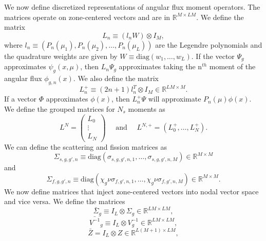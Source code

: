 We now define discretized representations of angular flux moment operators. The matrices operate on zone-centered vectors and are in $\mathbb{R}^{M \times LM}$. We define the matrix
\begin{equation}
	L_{n} \equiv (l_{n}W) \otimes I_{M},
\end{equation}
where $l_{n} \equiv (P_{n}(\mu_{1}), P_{n}(\mu_{2}), \dots, P_{n}(\mu_{L}))$ are the Legendre polynomials and the quadrature weights are given by $W \equiv \text{diag}(w_{1}, \dots, w_{L})$.
If the vector $\Psi_{g}$ approximates $\psi_{g}(x, \mu)$, then $L_{n}\Psi_{g}$ approximates taking the n$^{th}$ moment of the angular flux $\phi_{g,n}(x)$. We also define the matrix
\begin{equation}
	L_{n}^{+} \equiv (2n+1)l_{n}^{T} \otimes I_{M} \in \mathbb{R}^{LM \times M}.
\end{equation}
If a vector $\Phi$ approximates $\phi(x)$, then $L_{n}^{+}\Psi$ will approximate $P_{n}(\mu)\phi(x)$. We define the grouped matrices for $N_{s}$ moments as
\begin{equation}
L^{N} = \begin{pmatrix}
		L_{0} \\
		\vdots \\
		L_{N}
	     \end{pmatrix} \quad \text{ and } \quad
L^{N,+} = (L_{0}^{+}, \dots, L_{N}^{+}).
\end{equation}
We can define the scattering and fission matrices as
\begin{equation}
	\Sigma_{s,g,g',n} \equiv \text{diag}(\sigma_{s,g,g',n,1}, \dots, \sigma_{s,g,g',n,M}) \in \mathbb{R}^{M \times M}
\end{equation}
and
\begin{equation}
	\Sigma_{f,g,g',n} \equiv \text{diag}(\chi_{g}\nu\sigma_{f,g',n,1}, \dots, \chi_{g}\nu\sigma_{f,g',n,M}) \in \mathbb{R}^{M \times M}.
\end{equation}
We now define matrices that inject zone-centered vectors into nodal vector space and vice versa. We define the matrices
\begin{equation}
\bar{\Sigma}_{g} \equiv I_{L} \otimes \Sigma_{g} \in \mathbb{R}^{LM \times LM},
\end{equation}
\begin{equation}
\bar{V^{-1}}_{g} \equiv I_{L} \otimes V^{-1}_{g} \in \mathbb{R}^{LM \times LM},
\end{equation}
\begin{equation}
	\bar{Z} = I_{L} \otimes Z \in \mathbb{R}^{L(M+1) \times LM},
\end{equation}

